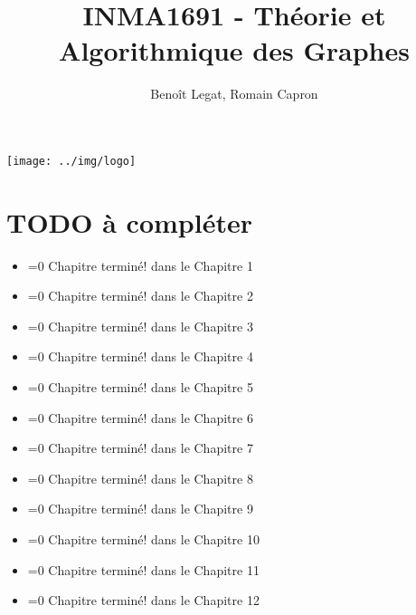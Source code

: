 

\title{INMA1691 - Théorie et Algorithmique des Graphes}
\author{Beno\^it Legat, Romain Capron}



\maketitle
\begin{center}
  \texttt{[image: ../img/logo]}
\end{center}
\newpage
\clearpage

\tableofcontents
\newpage


\newcommand{\addTODO}
{
  \textcolor{red}{TODO}\stepcounter{todo_\thesection}
}

\newcommand{\chapterdone}[2]
{
  \ifnum#1=0
    Chapitre terminé!
  \else
    #1 dans le Chapitre #2
  \fi
}














\clearpage
\section{TODO à compléter \textcolor{red}{\danger}}
\begin{itemize}
  \item \chapterdone{}{1}
  \item \chapterdone{}{2}
  \item \chapterdone{}{3}
  \item \chapterdone{}{4}
  \item \chapterdone{}{5}
  \item \chapterdone{}{6}
  \item \chapterdone{}{7}
  \item \chapterdone{}{8}
  \item \chapterdone{}{9}
  \item \chapterdone{}{10}
  \item \chapterdone{}{11}
  \item \chapterdone{}{12}\\
\end{itemize}

